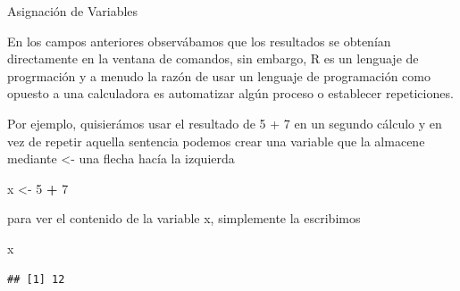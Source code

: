 \documentclass[ignorenonframetext,]{beamer}
\newenvironment{Shaded}{\begin{snugshade}}{\end{snugshade}}
\newcommand{\DecValTok}[1]{\textcolor[rgb]{0.00,0.00,0.81}{#1}}
\newcommand{\StringTok}[1]{\textcolor[rgb]{0.31,0.60,0.02}{#1}}
\newcommand{\OperatorTok}[1]{\textcolor[rgb]{0.81,0.36,0.00}{\textbf{#1}}}
\newcommand{\NormalTok}[1]{#1}
\begin{document}
\begin{frame}[fragile]{Asignación de Variables}

En los campos anteriores observábamos que los resultados se obtenían
directamente en la ventana de comandos, sin embargo, R es un lenguaje de
progrmación y a menudo la razón de usar un lenguaje de programación como
opuesto a una calculadora es automatizar algún proceso o establecer
repeticiones.

Por ejemplo, quisierámos usar el resultado de 5 + 7 en un segundo
cálculo y en vez de repetir aquella sentencia podemos crear una variable
que la almacene mediante \textless{}- una flecha hacía la izquierda

\begin{Shaded}
\begin{Highlighting}[]
\NormalTok{x <-}\StringTok{ }\DecValTok{5} \OperatorTok{+}\StringTok{ }\DecValTok{7}
\end{Highlighting}
\end{Shaded}

para ver el contenido de la variable x, simplemente la escribimos

\begin{Shaded}
\begin{Highlighting}[]
\NormalTok{x}
\end{Highlighting}
\end{Shaded}

\begin{verbatim}
## [1] 12
\end{verbatim}

\end{frame}
\end{document}
